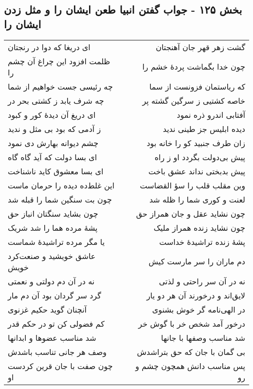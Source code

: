 \begin{center}
\section*{بخش ۱۲۵ - جواب گفتن انبیا طعن ایشان را و  مثل زدن ایشان را}
\label{sec:sh125}
\begin{longtable}{l p{0.5cm} r}
ای دریغا که دوا در رنجتان
&&
گشت زهر قهر جان آهنجتان
\\
ظلمت افزود این چراغ آن چشم را
&&
چون خدا بگماشت پردهٔ خشم را
\\
چه رئیسی جست خواهیم از شما
&&
که ریاستمان فزونست از سما
\\
چه شرف یابد ز کشتی بحر در
&&
خاصه کشتیی ز سرگین گشته پر
\\
ای دریغ آن دیدهٔ کور و کبود
&&
آفتابی اندرو ذره نمود
\\
ز آدمی که بود بی مثل و ندید
&&
دیده ابلیس جز طینی ندید
\\
چشم دیوانه بهارش دی نمود
&&
زان طرف جنبید کو را خانه بود
\\
ای بسا دولت که آید گاه گاه
&&
پیش بی‌دولت بگردد او ز راه
\\
ای بسا معشوق کاید ناشناخت
&&
پیش بدبختی نداند عشق باخت
\\
این غلط‌ده دیده را حرمان ماست
&&
وین مقلب قلب را سؤ القضاست
\\
چون بت سنگین شما را قبله شد
&&
لعنت و کوری شما را ظله شد
\\
چون بشاید سنگتان انباز حق
&&
چون نشاید عقل و جان همراز حق
\\
پشهٔ مرده هما را شد شریک
&&
چون نشاید زنده همراز ملیک
\\
یا مگر مرده تراشیدهٔ شماست
&&
پشهٔ زنده تراشیدهٔ خداست
\\
عاشق خویشید و صنعت‌کرد خویش
&&
دم ماران را سر مارست کیش
\\
نه در آن دم دولتی و نعمتی
&&
نه در آن سر راحتی و لذتی
\\
گرد سر گردان بود آن دم مار
&&
لایق‌اند و درخورند آن هر دو یار
\\
آنچنان گوید حکیم غزنوی
&&
در الهی‌نامه گر خوش بشنوی
\\
کم فضولی کن تو در حکم قدر
&&
درخور آمد شخص خر با گوش خر
\\
شد مناسب عضوها و ابدانها
&&
شد مناسب وصفها با جانها
\\
وصف هر جانی تناسب باشدش
&&
بی گمان با جان که حق بتراشدش
\\
چون صفت با جان قرین کردست او
&&
پس مناسب دانش همچون چشم و رو
\\

\end{longtable}
\end{center}
